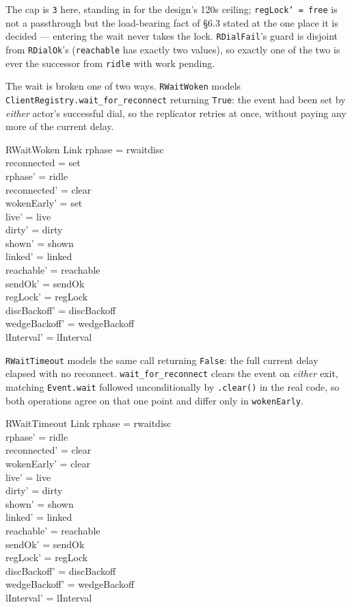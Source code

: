 \documentclass[a4paper,10pt,fleqn]{article}
\begin{document}
The cap is \texttt{3} here, standing in for the design's 120s ceiling;
\texttt{regLock' = free} is not a passthrough but the load-bearing fact of
\S6.3 stated at the one place it is decided --- entering the wait never
takes the lock.  \texttt{RDialFail}'s guard is disjoint from
\texttt{RDialOk}'s (\texttt{reachable} has exactly two values), so exactly
one of the two is ever the successor from \texttt{ridle} with work pending.

The wait is broken one of two ways.  \texttt{RWaitWoken} models
\texttt{ClientRegistry.wait\_for\_reconnect} returning \texttt{True}: the
event had been set by \emph{either} actor's successful dial, so the
replicator retries at once, without paying any more of the current delay.

\begin{schema}{RWaitWoken}
  \Delta Link
\where
  rphase = rwaitdisc \\
  reconnected = set \\
  rphase' = ridle \\
  reconnected' = clear \\
  wokenEarly' = set \\
  live' = live \\ dirty' = dirty \\ shown' = shown \\ linked' = linked \\
  reachable' = reachable \\ sendOk' = sendOk \\ regLock' = regLock \\
  discBackoff' = discBackoff \\ wedgeBackoff' = wedgeBackoff \\
  lInterval' = lInterval
\end{schema}

\texttt{RWaitTimeout} models the same call returning \texttt{False}: the
full current delay elapsed with no reconnect.  \texttt{wait\_for\_reconnect}
clears the event on \emph{either} exit, matching \texttt{Event.wait}
followed unconditionally by \texttt{.clear()} in the real code, so both
operations agree on that one point and differ only in \texttt{wokenEarly}.

\begin{schema}{RWaitTimeout}
  \Delta Link
\where
  rphase = rwaitdisc \\
  rphase' = ridle \\
  reconnected' = clear \\
  wokenEarly' = clear \\
  live' = live \\ dirty' = dirty \\ shown' = shown \\ linked' = linked \\
  reachable' = reachable \\ sendOk' = sendOk \\ regLock' = regLock \\
  discBackoff' = discBackoff \\ wedgeBackoff' = wedgeBackoff \\
  lInterval' = lInterval
\end{schema}
\end{document}
